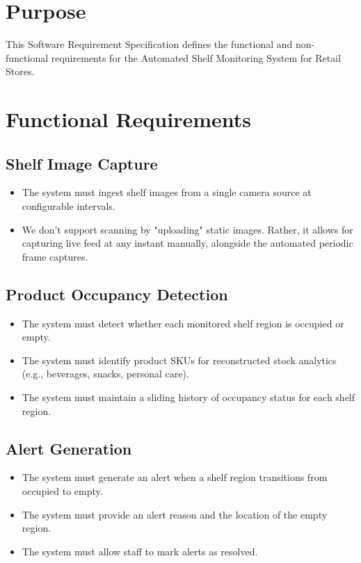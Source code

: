 \section{Purpose}

This Software Requirement Specification defines the functional and non-functional requirements for the Automated Shelf Monitoring System for Retail Stores.

\section{Functional Requirements}

\subsection{Shelf Image Capture}
\begin{itemize}
    \item The system must ingest shelf images from a single camera source at configurable intervals.
    \item We don't support scanning by "uploading" static images. Rather, it allows for capturing live feed at any instant manually, alongside the automated periodic frame captures.
\end{itemize}

\subsection{Product Occupancy Detection}
\begin{itemize}
    \item The system must detect whether each monitored shelf region is occupied or empty.
    \item The system must identify product SKUs for reconstructed stock analytics (e.g., beverages, snacks, personal care).
    \item The system must maintain a sliding history of occupancy status for each shelf region.
\end{itemize}

\subsection{Alert Generation}
\begin{itemize}
    \item The system must generate an alert when a shelf region transitions from occupied to empty.
    \item The system must provide an alert reason and the location of the empty region.
    \item The system must allow staff to mark alerts as resolved.
\end{itemize}

